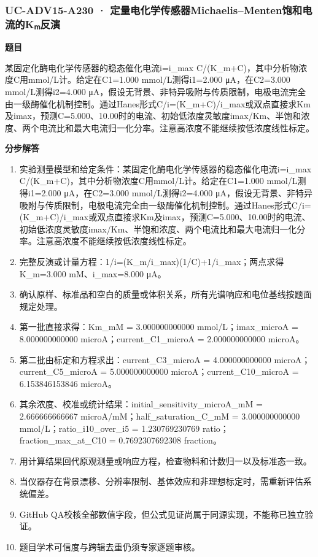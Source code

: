 \documentclass[UTF8,11pt,a4paper]{ctexart}
\begin{document}
\subsubsection*{UC-ADV15-A230 · 定量电化学传感器Michaelis–Menten饱和电流的Kₘ反演}
\noindent\textbf{题目}\par
某固定化酶电化学传感器的稳态催化电流i=i\_max C/(K\_m+C)，其中分析物浓度C用mmol/L计。给定在C1=1.000 mmol/L测得i1=2.000 μA，在C2=3.000 mmol/L测得i2=4.000 μA，假设无背景、非特异吸附与传质限制，电极电流完全由一级酶催化机制控制。通过Hanes形式C/i=(K\_m+C)/i\_max或双点直接求Km及imax，预测C=5.000、10.00时的电流、初始低浓度灵敏度imax/Km、半饱和浓度、两个电流比和最大电流归一化分率。注意高浓度不能继续按低浓度线性标定。\par
\medskip\noindent\textbf{分步解答}
\begin{enumerate}
\item 实验测量模型和给定条件：某固定化酶电化学传感器的稳态催化电流i=i\_max C/(K\_m+C)，其中分析物浓度C用mmol/L计。给定在C1=1.000 mmol/L测得i1=2.000 μA，在C2=3.000 mmol/L测得i2=4.000 μA，假设无背景、非特异吸附与传质限制，电极电流完全由一级酶催化机制控制。通过Hanes形式C/i=(K\_m+C)/i\_max或双点直接求Km及imax，预测C=5.000、10.00时的电流、初始低浓度灵敏度imax/Km、半饱和浓度、两个电流比和最大电流归一化分率。注意高浓度不能继续按低浓度线性标定。
\item 完整反演或计量方程：1/i=(K\_m/i\_max)(1/C)+1/i\_max；两点求得K\_m=3.000 mM、i\_max=8.000 μA。
\item 确认原样、标准品和空白的质量或体积关系，所有光谱响应和电位基线按题面规定处理。
\item 第一批直接求得：Km\_mM = 3.000000000000 mmol/L；imax\_microA = 8.000000000000 microA；current\_C1\_microA = 2.000000000000 microA。
\item 第二批由标定和方程求出：current\_C3\_microA = 4.000000000000 microA；current\_C5\_microA = 5.000000000000 microA；current\_C10\_microA = 6.153846153846 microA。
\item 其余浓度、校准或统计结果：initial\_sensitivity\_microA\_mM = 2.666666666667 microA/mM；half\_saturation\_C\_mM = 3.000000000000 mmol/L；ratio\_i10\_over\_i5 = 1.230769230769 ratio；fraction\_max\_at\_C10 = 0.7692307692308 fraction。
\item 用计算结果回代原观测量或响应方程，检查物料和计数归一以及标准态一致。
\item 当仪器存在背景漂移、分辨率限制、基体效应和非理想标定时，需重新评估系统偏差。
\item GitHub QA校核全部数值字段，但公式见证尚属于同源实现，不能称已独立验证。
\item 题目学术可信度与跨辑去重仍须专家逐题审核。
\end{enumerate}
\end{document}

